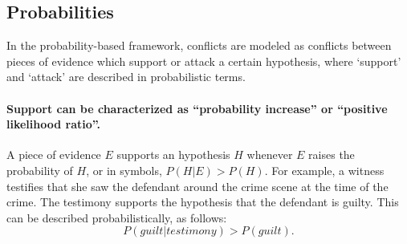 \documentclass[10pt]{article}
\begin{document}
\subsection{Probabilities}

In the probability-based framework, conflicts are modeled as conflicts between pieces 
of evidence which support or attack a certain hypothesis, where `support' 
and `attack' are described in probabilistic terms. 

\paragraph{Support can be characterized as ``probability increase'' or ``positive likelihood ratio''.} 
A piece of evidence $E$ supports an 
hypothesis $H$ whenever $E$ raises the probability of $H$, or in symbols, 
$P(H|E) > P(H)$. 
For example, a witness 
testifies that she saw the defendant around the crime scene
 at the time of the crime. The testimony supports the hypothesis 
 that the defendant is guilty. 
This can be described probabilistically, as follows:
 \[ P(\textit{guilt}|\textit{testimony}) > P(\textit{guilt}).\] 
\end{document}
